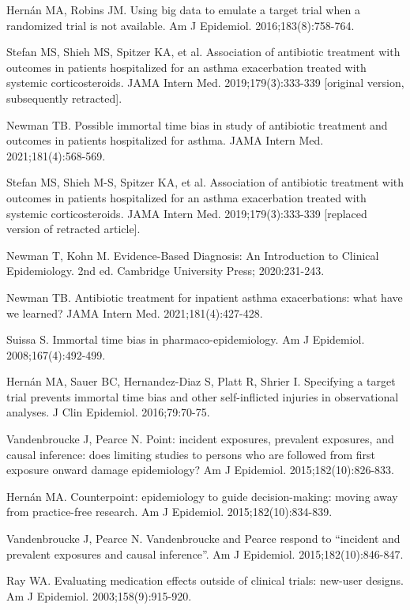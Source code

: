 \begin{references}
\item Hernán MA, Robins JM. Using big data to emulate a target trial when a randomized trial is not available. Am J Epidemiol. 2016;183(8):758-764.
\item Stefan MS, Shieh MS, Spitzer KA, et al. Association of antibiotic treatment with outcomes in patients hospitalized for an asthma exacerbation treated with systemic corticosteroids. JAMA Intern Med. 2019;179(3):333-339 [original version, subsequently retracted].
\item Newman TB. Possible immortal time bias in study of antibiotic treatment and outcomes in patients hospitalized for asthma. JAMA Intern Med. 2021;181(4):568-569.
\item Stefan MS, Shieh M-S, Spitzer KA, et al. Association of antibiotic treatment with outcomes in patients hospitalized for an asthma exacerbation treated with systemic corticosteroids. JAMA Intern Med. 2019;179(3):333-339 [replaced version of retracted article].
\item Newman T, Kohn M. Evidence-Based Diagnosis: An Introduction to Clinical Epidemiology. 2nd ed. Cambridge University Press; 2020:231-243.
\item Newman TB. Antibiotic treatment for inpatient asthma exacerbations: what have we learned? JAMA Intern Med. 2021;181(4):427-428.
\item Suissa S. Immortal time bias in pharmaco-epidemiology. Am J Epidemiol. 2008;167(4):492-499.
\item Hernán MA, Sauer BC, Hernandez-Diaz S, Platt R, Shrier I. Specifying a target trial prevents immortal time bias and other self-inflicted injuries in observational analyses. J Clin Epidemiol. 2016;79:70-75.
\item Vandenbroucke J, Pearce N. Point: incident exposures, prevalent exposures, and causal inference: does limiting studies to persons who are followed from first exposure onward damage epidemiology? Am J Epidemiol. 2015;182(10):826-833.
\item Hernán MA. Counterpoint: epidemiology to guide decision-making: moving away from practice-free research. Am J Epidemiol. 2015;182(10):834-839.
\item Vandenbroucke J, Pearce N. Vandenbroucke and Pearce respond to “incident and prevalent exposures and causal inference”. Am J Epidemiol. 2015;182(10):846-847.
\item Ray WA. Evaluating medication effects outside of clinical trials: new-user designs. Am J Epidemiol. 2003;158(9):915-920.

\end{references}
